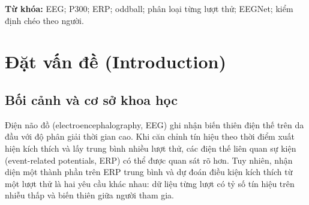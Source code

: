 \documentclass[11pt,a4paper]{article}
\begin{document}
\begin{abstract}
\textbf{Mục tiêu:} Khảo sát đáp ứng P300 và đánh giá khả năng phân biệt kích thích thường xuyên với kích thích đích trên từng lượt thử EEG; so sánh các mô hình học máy sử dụng đặc trưng với mạng EEGNet và xem xét khả năng giải thích của mô hình.

\textbf{Phương pháp:} Phân tích thứ cấp tác vụ oddball thị giác thuộc bộ dữ liệu Nencki--Symfonia gồm 42 người. Quy trình tiền xử lý tạo các đoạn tín hiệu 128 kênh, 250 Hz, từ $-200$ đến $1000$ ms. Phân tích chính dùng 39 người đáp ứng yêu cầu hành vi và 21.878 lượt thử đúng thuộc hai lớp, trong đó 2.951 lượt là kích thích đích. Các mô hình dùng 402 đặc trưng được so sánh với EEGNet-8,2 trên cùng thiết kế kiểm định chéo năm phần theo người tham gia. ERP được lấy trung bình với trọng số bằng nhau cho từng người; gradient đầu vào được dùng để khảo sát độ nhạy của mạng.

\textbf{Kết quả:} Hiệu biên độ đích trừ thường xuyên tại Pz trong 300--500 ms đạt $5{,}05\pm2{,}28\,\mu$V, $t(38)=13{,}82$, $d_z=2{,}21$. Có 22/39 người thỏa đồng thời ba tiêu chí P3b do dự án định nghĩa; tỷ lệ tăng lên 32/39 trong phân tích bổ sung 300--600 ms. Logistic regression đạt balanced accuracy $0{,}874\pm0{,}037$; LDA đạt ROC-AUC $0{,}947\pm0{,}022$. EEGNet đạt balanced accuracy $0{,}907\pm0{,}021$, ROC-AUC $0{,}970\pm0{,}010$ và average precision $0{,}873\pm0{,}042$. Khoảng $40{,}2\%$ tổng saliency nằm trong 300--600 ms, nhưng cực đại theo không gian tập trung ở các kênh trung tâm hơn là vùng đỉnh.

\textbf{Kết luận:} EEGNet cho kết quả cao nhất trong phép so sánh hiện có. Hồ sơ thời gian phù hợp với sự đóng góp của P300, song chưa tách được thông tin nhận thức khỏi hoạt động liên quan đáp ứng vận động. Báo cáo dựa trên mã nguồn và kết quả đã lưu, có đối chiếu thống kê; không chạy lại toàn bộ tiền xử lý hoặc huấn luyện mô hình.
\end{abstract}
\textbf{Từ khóa:} EEG; P300; ERP; oddball; phân loại từng lượt thử; EEGNet; kiểm định chéo theo người.
\tableofcontents
\clearpage
{}

\section{Đặt vấn đề (Introduction)}
\subsection{Bối cảnh và cơ sở khoa học}
Điện não đồ (electroencephalography, EEG) ghi nhận biến thiên điện thế trên da đầu với độ phân giải thời gian cao. Khi căn chỉnh tín hiệu theo thời điểm xuất hiện kích thích và lấy trung bình nhiều lượt thử, các điện thế liên quan sự kiện (event-related potentials, ERP) có thể được quan sát rõ hơn. Tuy nhiên, nhận diện một thành phần trên ERP trung bình và dự đoán điều kiện kích thích từ một lượt thử là hai yêu cầu khác nhau: dữ liệu từng lượt có tỷ số tín hiệu trên nhiễu thấp và biến thiên giữa người tham gia.
\end{document}
